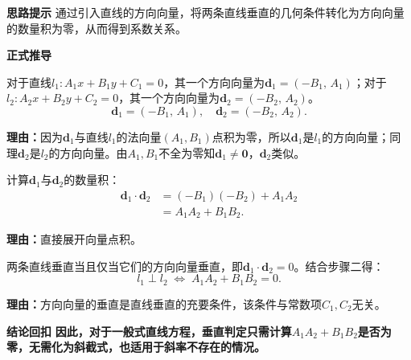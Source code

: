 \begin{proofbox}
	\textbf{\textcolor{CProof}{思路提示}}
	通过引入直线的方向向量，将两条直线垂直的几何条件转化为方向向量的数量积为零，从而得到系数关系。

	\medskip
	\textbf{\textcolor{CProof}{正式推导}}
	\begin{description}[style=nextline, leftmargin=2.8em, labelsep=0.5em, itemsep=0.55em]
		\item[\textbf{步骤一（取方向向量）：}]
			对于直线$l_1:A_1x+B_1y+C_1=0$，其一个方向向量为$\mathbf{d}_1=(-B_1,\,A_1)$；对于$l_2:A_2x+B_2y+C_2=0$，其一个方向向量为$\mathbf{d}_2=(-B_2,\,A_2)$。
			\[
				\mathbf{d}_1=(-B_1,\,A_1),\quad\mathbf{d}_2=(-B_2,\,A_2).
			\]
			\par\textbf{理由：}因为$\mathbf{d}_1$与直线$l_1$的法向量$(A_1,B_1)$点积为零，所以$\mathbf{d}_1$是$l_1$的方向向量；同理$\mathbf{d}_2$是$l_2$的方向向量。由$A_1,B_1$不全为零知$\mathbf{d}_1\neq\mathbf{0}$，$\mathbf{d}_2$类似。
		\item[\textbf{步骤二（计算数量积）：}]
			计算$\mathbf{d}_1$与$\mathbf{d}_2$的数量积：
			\[
				\begin{aligned}
					\mathbf{d}_1\cdot\mathbf{d}_2 &= (-B_1)(-B_2)+A_1A_2 \\ &= A_1A_2+B_1B_2.
			\end{aligned}
			\]
			\par\textbf{理由：}直接展开向量点积。
		\item[\textbf{步骤三（垂直等价）：}]
			两条直线垂直当且仅当它们的方向向量垂直，即$\mathbf{d}_1\cdot\mathbf{d}_2=0$。结合步骤二得：
			\[
				l_1\perp l_2\;\Longleftrightarrow\;A_1A_2+B_1B_2=0.
			\]
			\par\textbf{理由：}方向向量的垂直是直线垂直的充要条件，该条件与常数项$C_1,C_2$无关。
	\end{description}

	\medskip
	\textbf{\textcolor{CProof}{结论回扣}}
	\textbf{因此，对于一般式直线方程，垂直判定只需计算$A_1A_2+B_1B_2$是否为零，无需化为斜截式，也适用于斜率不存在的情况。}
\end{proofbox}
